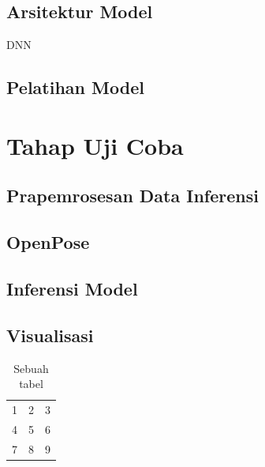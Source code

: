 \subsection{Arsitektur Model}
DNN

\subsection{Pelatihan Model}


\section{Tahap Uji Coba} \label{sec:3-TahapUjiCoba}

\subsection{Prapemrosesan Data Inferensi}

\subsection{OpenPose}

\subsection{Inferensi Model}

\subsection{Visualisasi}

\begin{table}[htbp]
    \captionsetup{labelfont=bf, textfont=bf}
    \caption{Sebuah tabel}
    \vspace{-20pt}
    \begin{center}
        \begin{tabular}{| l c r |}
            \hline
            1 & 2 & 3 \\
            4 & 5 & 6 \\
            7 & 8 & 9 \\
            \hline
        \end{tabular}
    \end{center}
    \vspace{-10pt}
    \captionsetup{labelfont=md, textfont=md}
\end{table}